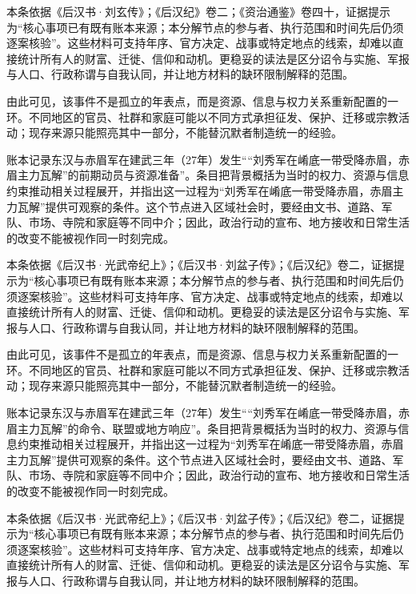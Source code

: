 本条依据《后汉书·刘玄传》；《后汉纪》卷二；《资治通鉴》卷四十，证据提示为“核心事项已有既有账本来源；本分解节点的参与者、执行范围和时间先后仍须逐案核验”。这些材料可支持年序、官方决定、战事或特定地点的线索，却难以直接统计所有人的财富、迁徙、信仰和动机。更稳妥的读法是区分诏令与实施、军报与人口、行政称谓与自我认同，并让地方材料的缺环限制解释的范围。

由此可见，该事件不是孤立的年表点，而是资源、信息与权力关系重新配置的一环。不同地区的官员、社群和家庭可能以不同方式承担征发、保护、迁移或宗教活动；现存来源只能照亮其中一部分，不能替沉默者制造统一的经验。

账本记录东汉与赤眉军在建武三年（27年）发生““刘秀军在崤底一带受降赤眉，赤眉主力瓦解”的前期动员与资源准备”。条目把背景概括为当时的权力、资源与信息约束推动相关过程展开，并指出这一过程为“刘秀军在崤底一带受降赤眉，赤眉主力瓦解”提供可观察的条件。这个节点进入区域社会时，要经由文书、道路、军队、市场、寺院和家庭等不同中介；因此，政治行动的宣布、地方接收和日常生活的改变不能被视作同一时刻完成。

本条依据《后汉书·光武帝纪上》；《后汉书·刘盆子传》；《后汉纪》卷二，证据提示为“核心事项已有既有账本来源；本分解节点的参与者、执行范围和时间先后仍须逐案核验”。这些材料可支持年序、官方决定、战事或特定地点的线索，却难以直接统计所有人的财富、迁徙、信仰和动机。更稳妥的读法是区分诏令与实施、军报与人口、行政称谓与自我认同，并让地方材料的缺环限制解释的范围。

由此可见，该事件不是孤立的年表点，而是资源、信息与权力关系重新配置的一环。不同地区的官员、社群和家庭可能以不同方式承担征发、保护、迁移或宗教活动；现存来源只能照亮其中一部分，不能替沉默者制造统一的经验。

账本记录东汉与赤眉军在建武三年（27年）发生““刘秀军在崤底一带受降赤眉，赤眉主力瓦解”的命令、联盟或地方响应”。条目把背景概括为当时的权力、资源与信息约束推动相关过程展开，并指出这一过程为“刘秀军在崤底一带受降赤眉，赤眉主力瓦解”提供可观察的条件。这个节点进入区域社会时，要经由文书、道路、军队、市场、寺院和家庭等不同中介；因此，政治行动的宣布、地方接收和日常生活的改变不能被视作同一时刻完成。

本条依据《后汉书·光武帝纪上》；《后汉书·刘盆子传》；《后汉纪》卷二，证据提示为“核心事项已有既有账本来源；本分解节点的参与者、执行范围和时间先后仍须逐案核验”。这些材料可支持年序、官方决定、战事或特定地点的线索，却难以直接统计所有人的财富、迁徙、信仰和动机。更稳妥的读法是区分诏令与实施、军报与人口、行政称谓与自我认同，并让地方材料的缺环限制解释的范围。

